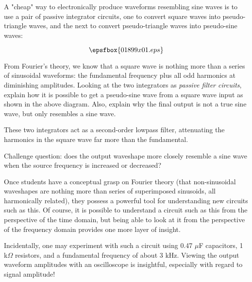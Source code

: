 

A "cheap" way to electronically produce waveforms resembling sine waves is to use a pair of passive integrator circuits, one to convert square waves into pseudo-triangle waves, and the next to convert pseudo-triangle waves into pseudo-sine waves:

$$\epsfbox{01899x01.eps}$$

From Fourier's theory, we know that a square wave is nothing more than a series of sinusoidal waveforms: the fundamental frequency plus all odd harmonics at diminishing amplitudes.  Looking at the two integrators as {\it passive filter circuits}, explain how it is possible to get a pseudo-sine wave from a square wave input as shown in the above diagram.  Also, explain why the final output is not a true sine wave, but only resembles a sine wave.







These two integrators act as a second-order lowpass filter, attenuating the harmonics in the square wave far more than the fundamental.

\vskip 10pt

Challenge question: does the output waveshape more closely resemble a sine wave when the source frequency is increased or decreased?







Once students have a conceptual grasp on Fourier theory (that non-sinusoidal waveshapes are nothing more than series of superimposed sinusoids, all harmonically related), they possess a powerful tool for understanding new circuits such as this.  Of course, it is possible to understand a circuit such as this from the perspective of the time domain, but being able to look at it from the perspective of the frequency domain provides one more layer of insight.

Incidentally, one may experiment with such a circuit using 0.47 $\mu$F capacitors, 1 k$\Omega$ resistors, and a fundamental frequency of about 3 kHz.  Viewing the output waveform amplitudes with an oscilloscope is insightful, especially with regard to signal amplitude!




